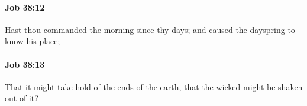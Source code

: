 		\paragraph{Job 38:12} %
			\label{JOB-38-12}

			Hast thou commanded the morning since thy days; and caused the dayspring to know his place;


		\paragraph{Job 38:13} %
			\label{JOB-38-13}

			That it might take hold of the ends of the earth, that the wicked might be shaken out of it?


